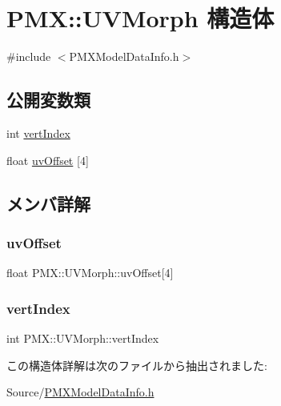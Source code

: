 \hypertarget{struct_p_m_x_1_1_u_v_morph}{}\section{P\+MX\+:\+:U\+V\+Morph 構造体}
\label{struct_p_m_x_1_1_u_v_morph}


{\ttfamily \#include $<$P\+M\+X\+Model\+Data\+Info.\+h$>$}

\subsection*{公開変数類}
\begin{DoxyCompactItemize}
\item 
int \mbox{\hyperlink{struct_p_m_x_1_1_u_v_morph_a2380c3f673194ecfb46bab985931377b}{vert\+Index}}
\item 
float \mbox{\hyperlink{struct_p_m_x_1_1_u_v_morph_a99f154eca485df48612fb5669ec2601d}{uv\+Offset}} \mbox{[}4\mbox{]}
\end{DoxyCompactItemize}


\subsection{メンバ詳解}
\mbox{\label{struct_p_m_x_1_1_u_v_morph_a99f154eca485df48612fb5669ec2601d}} 
\subsubsection{\texorpdfstring{uv\+Offset}{uvOffset}}
{\footnotesize\ttfamily float P\+M\+X\+::\+U\+V\+Morph\+::uv\+Offset\mbox{[}4\mbox{]}}

\mbox{\label{struct_p_m_x_1_1_u_v_morph_a2380c3f673194ecfb46bab985931377b}} 
\subsubsection{\texorpdfstring{vert\+Index}{vertIndex}}
{\footnotesize\ttfamily int P\+M\+X\+::\+U\+V\+Morph\+::vert\+Index}



この構造体詳解は次のファイルから抽出されました\+:\begin{DoxyCompactItemize}
\item 
Source/\mbox{\hyperlink{_p_m_x_model_data_info_8h}{P\+M\+X\+Model\+Data\+Info.\+h}}\end{DoxyCompactItemize}
